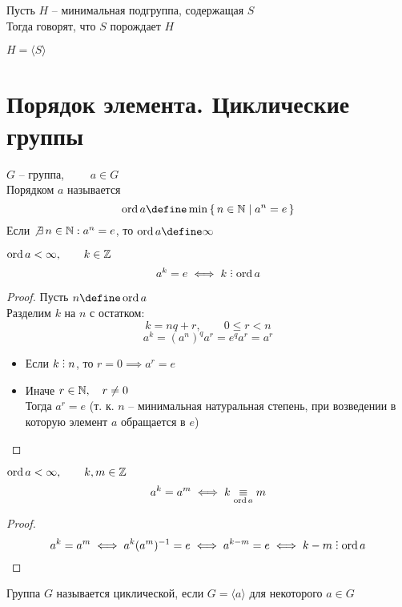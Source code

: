 \begin{definition}
	Пусть $ H $ -- минимальная подгруппа, содержащая $ S $ \\
	Тогда говорят, что $ S $ порождает $ H $
\end{definition}

\begin{notation}
	$ H = \langle S \rangle $
\end{notation}

\section{Порядок элемента. Циклические группы}

\begin{definition}
	$ G $ -- группа, $ \qquad a \in G $ \\
	Порядком $ a $ называется
	$$ \ord a \define \min\set{n \in \N | a^n = e} $$
	Если $ \not\exists\, n \in \mathbb{N} : a^n = e $, то $ \ord a \define \infty $
\end{definition}

\begin{props}
	\item $ \operatorname{ord} a < \infty, \qquad k \in \mathbb{Z} $
	$$ a^k = e \iff k \divby \ord a $$
	\begin{proof}
		Пусть $ n \define \ord a $ \\
		Разделим $ k $ на $ n $ с остатком:
		$$ k = nq + r, \qquad 0 \le r < n $$
		$$ a^k = (a^n)^qa^r = e^qa^r = a^r $$
		\begin{itemize}
			\item Если $ k \divby n $, то $ r = 0 \implies a^r = e $
			\item Иначе $ r \in \mathbb{N}, \quad r \ne 0 $ \\
			Тогда $ a^r = e $ (т. к. $ n $ -- минимальная натуральная степень, при возведении в которую элемент $ a $ обращается в $ e $)
		\end{itemize}
	\end{proof}
	\item $ \operatorname{ord} a < \infty, \qquad k, m \in \mathbb{Z} $
	$$ a^k = a^m \iff k \underset{\operatorname{ord} a}{\equiv} m $$
	\begin{proof}
		$$ a^k = a^m \iff a^k(a^m)^{-1} = e \iff a^{k - m} = e \iff k - m \divby \ord a $$
	\end{proof}
\end{props}

\begin{definition}
	Группа $ G $ называется циклической, если $ G = \langle a \rangle $ для некоторого $ a \in G $
\end{definition}

